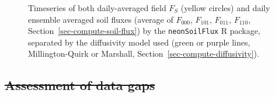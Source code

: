 \documentclass[
  letterpaper,
  DIV=11,
  numbers=noendperiod]{scrartcl}
\providecommand{\DIFdel}[1]{{\protect\color{red}\sout{#1}}}                      %
\providecommand{\DIFdelbegin}{} %
\newcommand{\DIFscaledelfig}{0.5}
\newlength{\DIFdelgraphicswidth} %
\newlength{\DIFdelgraphicsheight} %
\newcommand{\DIFdelincludegraphics}[2][]{%
\sbox{\DIFdelgraphicsbox}{\DIFOincludegraphics[#1]{#2}}%
\settoboxwidth{\DIFdelgraphicswidth}{\DIFdelgraphicsbox} %
\settoboxtotalheight{\DIFdelgraphicsheight}{\DIFdelgraphicsbox} %
\scalebox{\DIFscaledelfig}{%
\parbox[b]{\DIFdelgraphicswidth}{\usebox{\DIFdelgraphicsbox}\\[-\baselineskip] \rule{\DIFdelgraphicswidth}{0em}}\llap{\resizebox{\DIFdelgraphicswidth}{\DIFdelgraphicsheight}{%
\setlength{\unitlength}{\DIFdelgraphicswidth}%
\begin{picture}(1,1)%
\thicklines\linethickness{2pt} %
{\color[rgb]{1,0,0}\put(0,0){\framebox(1,1){}}}%
{\color[rgb]{1,0,0}\put(0,0){\line( 1,1){1}}}%
{\color[rgb]{1,0,0}\put(0,1){\line(1,-1){1}}}%
\end{picture}%
}\hspace*{3pt}}} %
} %
\DeclareRobustCommand{\DIFdelbegin}{\DIFOdelbegin \let\includegraphics\DIFdelincludegraphics} %
\begin{document}
\begin{figure}


\caption{\label{fig-flux-results-year}Timeseries of both daily-averaged
field \(F_{S}\) (yellow circles) and daily ensemble averaged soil fluxes
(average of \(F_{000}\), \(F_{101}\), \(F_{011}\), \(F_{110}\),
Section~\ref{sec-compute-soil-flux}) by the \texttt{neonSoilFlux} R
package, separated by the diffusivity model used (green or purple lines,
Millington-Quirk or Marshall, Section~\ref{sec-compute-diffusivity}).}

\end{figure}%

\DIFdelbegin \subsection{\DIFdel{Assessment of data gaps}}%
\addtocounter{subsection}{-1}%
\end{document}
